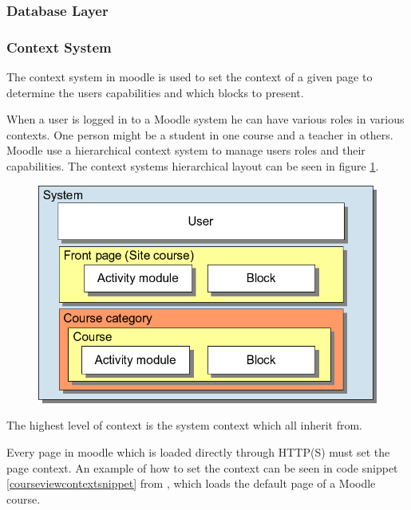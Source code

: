 	
	
	
	
	\subsubsection{Database Layer}
	
	
	
	
	
	\subsubsection{Context System}
The context system in moodle is used to set the context of a given page to determine the users capabilities and which blocks to present.
 
When a user is logged in to a Moodle system he can have various roles in various contexts. 
One person might be a student in one course and a teacher in others. 
Moodle use a hierarchical context system to manage users roles and their capabilities. 
The context systems hierarchical layout can be seen in figure \ref{fig:moodle-contexts}.
 
 \begin{figure}
	 \centering
		 \includegraphics[width=\textwidth]{images/moodle-contexts.png}
	 \label{fig:moodle-contexts}
 \end{figure}

The highest level of context is the system context which all inherit from. 

Every page in moodle which is loaded directly through HTTP(S) must set the page context. 
An example of how to set the context can be seen in code snippet \ref{courseviewcontextsnippet} from , which loads the default page of a Moodle course.

